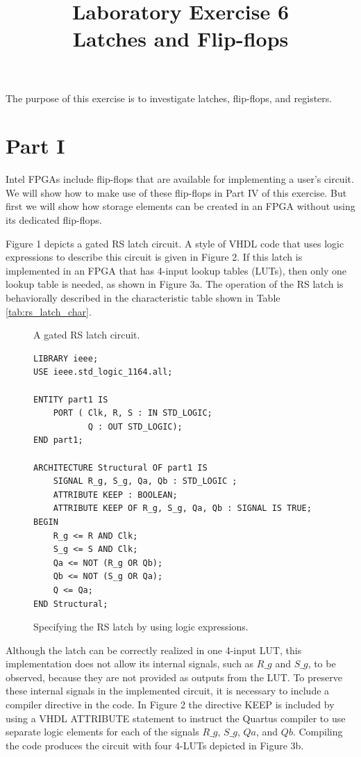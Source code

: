 \documentclass{article}
\title{Laboratory Exercise 6 \\ Latches and Flip-flops}
\author{}
\date{}
\begin{document}
\maketitle

The purpose of this exercise is to investigate latches, flip-flops, and registers.

\section*{Part I}

Intel FPGAs include flip-flops that are available for implementing a user's circuit. We will show how to make use of these flip-flops in Part IV of this exercise. But first we will show how storage elements can be created in an FPGA without using its dedicated flip-flops.

Figure 1 depicts a gated RS latch circuit. A style of VHDL code that uses logic expressions to describe this circuit is given in Figure 2. If this latch is implemented in an FPGA that has 4-input lookup tables (LUTs), then only one lookup table is needed, as shown in Figure 3a. The operation of the RS latch is behaviorally described in the characteristic table shown in Table \ref{tab:rs_latch_char}.

\begin{figure}[H]
    \centering
    
    \caption{A gated RS latch circuit.}
    \label{fig:gated_rs_latch}
\end{figure}

\begin{figure}[H]
    \centering
    \begin{verbatim}
LIBRARY ieee;
USE ieee.std_logic_1164.all;

ENTITY part1 IS
    PORT ( Clk, R, S : IN STD_LOGIC;
           Q : OUT STD_LOGIC);
END part1;

ARCHITECTURE Structural OF part1 IS
    SIGNAL R_g, S_g, Qa, Qb : STD_LOGIC ;
    ATTRIBUTE KEEP : BOOLEAN;
    ATTRIBUTE KEEP OF R_g, S_g, Qa, Qb : SIGNAL IS TRUE;
BEGIN
    R_g <= R AND Clk;
    S_g <= S AND Clk;
    Qa <= NOT (R_g OR Qb);
    Qb <= NOT (S_g OR Qa);
    Q <= Qa;
END Structural;
    \end{verbatim}
    \caption{Specifying the RS latch by using logic expressions.}
    \label{fig:vhdl_rs_latch}
\end{figure}

Although the latch can be correctly realized in one 4-input LUT, this implementation does not allow its internal signals, such as $R\_g$ and $S\_g$, to be observed, because they are not provided as outputs from the LUT. To preserve these internal signals in the implemented circuit, it is necessary to include a compiler directive in the code. In Figure 2 the directive KEEP is included by using a VHDL ATTRIBUTE statement to instruct the Quartus compiler to use separate logic elements for each of the signals $R\_g$, $S\_g$, $Qa$, and $Qb$. Compiling the code produces the circuit with four 4-LUTs depicted in Figure 3b.
\end{document}
